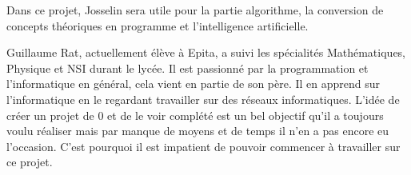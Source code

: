 \documentclass[12pt,a4paper]{article}
\begin{document}
\noindent Dans ce projet, Josselin sera utile pour la partie algorithme, la conversion de concepts théoriques en programme et l'intelligence artificielle.
\clearpage


Guillaume Rat, actuellement élève à Epita, a \noindent suivi les spécialités Mathématiques, Physique et NSI durant le lycée. Il est passionné par la programmation et l’informatique en général, cela vient en partie de son père. Il en apprend sur l’informatique en le regardant travailler sur des réseaux informatiques. L’idée de créer un projet de 0 et de le voir complété est un bel objectif qu'il a toujours voulu réaliser mais par manque de moyens et de temps il n'en a pas encore eu l'occasion. C’est pourquoi il est impatient de pouvoir commencer à travailler sur ce projet.
\end{document}
